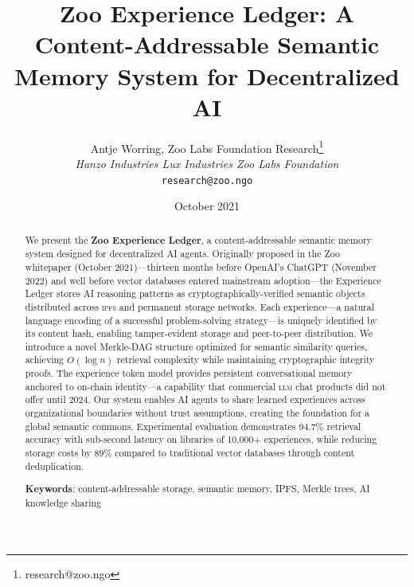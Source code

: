 \documentclass[11pt,letterpaper]{article}
\title{\textbf{Zoo Experience Ledger: A Content-Addressable Semantic Memory System for Decentralized AI}}
\author{
Antje Worring, Zoo Labs Foundation Research\thanks{research@zoo.ngo}\\
\textit{Hanzo Industries \quad Lux Industries \quad Zoo Labs Foundation}\\
\texttt{research@zoo.ngo}
}
\date{October 2021}
\newcommand{\IPFS}{\textsc{ipfs}}
\newcommand{\LLM}{\textsc{llm}}
\begin{document}
\zoocoverpage

\begin{abstract}
We present the \textbf{Zoo Experience Ledger}, a content-addressable semantic memory system designed for decentralized AI agents. Originally proposed in the Zoo whitepaper (October 2021)---thirteen months before OpenAI's ChatGPT (November 2022) and well before vector databases entered mainstream adoption---the Experience Ledger stores AI reasoning patterns as cryptographically-verified semantic objects distributed across \IPFS{} and permanent storage networks. Each experience---a natural language encoding of a successful problem-solving strategy---is uniquely identified by its content hash, enabling tamper-evident storage and peer-to-peer distribution. We introduce a novel Merkle-DAG structure optimized for semantic similarity queries, achieving $O(\log n)$ retrieval complexity while maintaining cryptographic integrity proofs. The experience token model provides persistent conversational memory anchored to on-chain identity---a capability that commercial \LLM{} chat products did not offer until 2024. Our system enables AI agents to share learned experiences across organizational boundaries without trust assumptions, creating the foundation for a global semantic commons. Experimental evaluation demonstrates 94.7\% retrieval accuracy with sub-second latency on libraries of 10,000+ experiences, while reducing storage costs by 89\% compared to traditional vector databases through content deduplication.

\textbf{Keywords}: content-addressable storage, semantic memory, IPFS, Merkle trees, AI knowledge sharing
\end{abstract}














\end{document}
